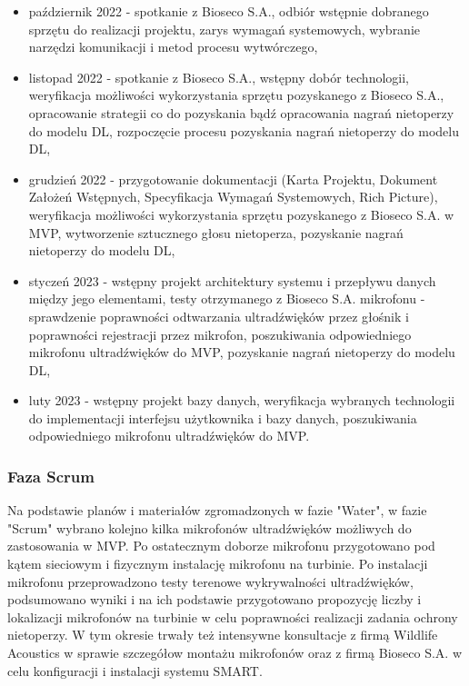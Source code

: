 \documentclass{sprz}
\begin{document}
\begin{itemize}
  \item{październik 2022 - spotkanie z Bioseco S.A., odbiór wstępnie dobranego sprzętu do realizacji projektu, zarys wymagań systemowych, wybranie narzędzi komunikacji i metod procesu wytwórczego,}
  \item{listopad 2022 - spotkanie z Bioseco S.A., wstępny dobór technologii, weryfikacja możliwości wykorzystania sprzętu pozyskanego z Bioseco S.A., opracowanie strategii co do pozyskania bądź opracowania nagrań nietoperzy do modelu DL, rozpoczęcie procesu pozyskania nagrań nietoperzy do modelu DL,}
  \item{grudzień 2022 - przygotowanie dokumentacji (Karta Projektu, Dokument Założeń Wstępnych, Specyfikacja Wymagań Systemowych, Rich Picture), weryfikacja możliwości wykorzystania sprzętu pozyskanego z Bioseco S.A. w MVP, wytworzenie sztucznego głosu nietoperza, pozyskanie nagrań nietoperzy do modelu DL,}
  \item{styczeń 2023 - wstępny projekt architektury systemu i przepływu danych między jego elementami, testy otrzymanego z Bioseco S.A. mikrofonu - sprawdzenie poprawności odtwarzania ultradźwięków przez głośnik i poprawności rejestracji przez mikrofon, poszukiwania odpowiedniego mikrofonu ultradźwięków do MVP, pozyskanie nagrań nietoperzy do modelu DL,}
  \item {luty 2023 - wstępny projekt bazy danych, weryfikacja wybranych technologii do implementacji interfejsu użytkownika i bazy danych, poszukiwania odpowiedniego mikrofonu ultradźwięków do MVP.}
  \end{itemize}

\subsubsection{Faza Scrum}
Na podstawie planów i materiałów zgromadzonych w fazie "Water", w fazie "Scrum" wybrano kolejno kilka mikrofonów ultradźwięków możliwych do zastosowania w MVP. Po ostatecznym doborze mikrofonu przygotowano pod kątem sieciowym i fizycznym instalację mikrofonu na turbinie. Po instalacji mikrofonu przeprowadzono testy terenowe wykrywalności ultradźwięków, podsumowano wyniki i na ich podstawie przygotowano propozycję liczby i lokalizacji mikrofonów na turbinie w celu poprawności realizacji zadania ochrony nietoperzy. W tym okresie trwały też intensywne konsultacje z firmą Wildlife Acoustics w sprawie szczegółow montażu mikrofonów oraz z firmą Bioseco S.A. w celu konfiguracji i instalacji systemu SMART. 
\end{document}
